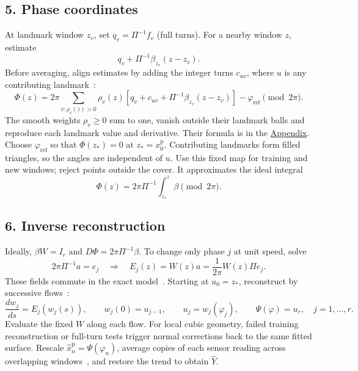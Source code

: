 \documentclass[11pt,a4paper]{article}
\begin{document}
\subsection*{5. Phase coordinates}
At landmark window $z_v$, set $q_v=\Pi^{-1}f_v$ (full turns).
For a nearby window $z$, estimate
\[
q_v+\Pi^{-1}\beta_{z_v}(z-z_v).
\]
Before averaging, align estimates by adding the integer turns $c_{uv}$,
where $u$ is any contributing landmark~\citep{Perea2020}:
\[
\Phi(z)=2\pi\sum_{v:\rho_v(z)>0}\rho_v(z)
\left[q_v+c_{uv}+\Pi^{-1}\beta_{z_v}(z-z_v)\right]
-\varphi_{\mathrm{ref}}\pmod{2\pi}.
\]
The smooth weights $\rho_v\ge0$ sum to one, vanish outside their landmark
balls and reproduce each landmark value and derivative.
Their formula is in the \hyperref[app:phase-weights]{Appendix}.
Choose $\varphi_{\mathrm{ref}}$ so that $\Phi(z_*)=0$ at $z_*=x_0^{\mathrm p}$.
Contributing landmarks form filled triangles, so the angles are independent of $u$.
Use this fixed map for training and new windows; reject points outside the cover.
It approximates the ideal integral
\[
\Phi(z)=2\pi\Pi^{-1}\int_{z_*}^z\beta\pmod{2\pi}.
\]

\subsection*{6. Inverse reconstruction}
Ideally, $\beta W=I_r$ and $D\Phi=2\pi\Pi^{-1}\beta$.
To change only phase $j$ at unit speed, solve
\[
2\pi\Pi^{-1}a=e_j
\quad\Longrightarrow\quad
E_j(z)=W(z)a=\frac{1}{2\pi}W(z)\Pi e_j.
\]
These fields commute in the exact model~\citep{Giannakis2019}.
Starting at $u_0=z_*$, reconstruct by successive flows~\citep[Theorem~9.46]{Lee2012}:
\[
\frac{dw_j}{ds}=E_j(w_j(s)),\qquad w_j(0)=u_{j-1},\qquad
u_j=w_j(\varphi_j),\qquad \Psi(\varphi)=u_r,\quad j=1,\ldots,r.
\]
Evaluate the fixed $W$ along each flow.
For local cubic geometry, failed training reconstruction or full-turn tests trigger
normal corrections back to the same fitted surface.
Rescale $\widehat x_n^{\mathrm p}=\Psi(\varphi_n)$, average copies of each
sensor reading across overlapping windows~\citep{GrothGhil2011}, and
restore the trend to obtain $\widehat Y$.
\end{document}
